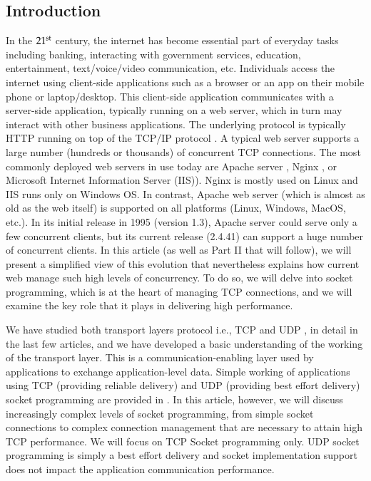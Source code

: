 \begin{multicols}{2}

\section{Introduction}
 
 In the $21^{\rm st}$ century, the internet has become essential part of everyday tasks including banking, interacting with government services, education, entertainment, text/voice/video communication, etc. Individuals access the internet using client-side applications such as a browser or an app on their mobile phone or laptop/desktop. This client-side application communicates with a server-side application, typically running on a web server, which in turn may interact with other business applications. The underlying protocol is typically HTTP \cite{art1-key01} running on top of the TCP/IP protocol \cite{art1-key02}\cite{art1-key03}. A typical web server supports a large number (hundreds or thousands) of concurrent TCP connections. The most commonly deployed web servers in use today are Apache server \cite{art1-key04}, Nginx \cite{art1-key05}, or Microsoft Internet Information Server (IIS))\cite{art1-key06}. Nginx is mostly used on Linux and IIS runs only on Windows OS. In contrast, Apache web server (which is almost as old as the web itself) is supported on all platforms (Linux, Windows, MacOS, etc.). In its initial release in 1995 (version 1.3), Apache server could serve only a few concurrent clients, but its current release (2.4.41) can support a huge number of concurrent clients. In this article (as well as Part II that will follow), we will present a simplified view of this evolution that nevertheless explains how current web manage such high levels of concurrency. To do so, we will delve into socket programming, which is at the heart of managing TCP connections, and we will examine the key role that it plays in delivering high performance.

We have studied both transport layers protocol i.e., TCP \cite{art1-key02} and UDP \cite{art1-key07}, in detail in the last few articles, and we have developed a basic understanding of the working of the transport layer. This is a communication-enabling layer used by applications to exchange application-level data. Simple working of applications using TCP (providing reliable delivery) and UDP (providing best effort delivery) socket programming are provided in \cite{art1-key08}.  In this article, however, we will discuss increasingly complex levels of socket programming, from simple socket connections to complex connection management that are necessary to attain high TCP performance.  We will focus on TCP Socket programming only. UDP socket programming is simply a best effort delivery and socket implementation support does not impact the application communication performance. 


\end{multicols}
